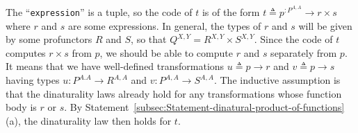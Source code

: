 The \textsf{``}\lstinline!expression!\textsf{''} is a tuple, so the code of $t$
is of the form $t\triangleq p^{:P^{A,A}}\rightarrow r\times s$ where
$r$ and $s$ are some expressions. In general, the types of $r$
and $s$ will be given by some profunctors $R$ and $S$, so that
$Q^{X,Y}=R^{X,Y}\times S^{X,Y}$. Since the code of $t$ computes
$r\times s$ from $p$, we should be able to compute $r$ and $s$
separately from $p$. It means that we have well-defined transformations
$u\triangleq p\rightarrow r$ and $v\triangleq p\rightarrow s$ having
types $u:P^{A.A}\rightarrow R^{A,A}$ and $v:P^{A,A}\rightarrow S^{A,A}$.
The inductive assumption is that the dinaturality laws already hold
for any transformations whose function body is $r$ or $s$. By Statement~\ref{subsec:Statement-dinatural-product-of-functions}(a),
the dinaturality law then holds for $t$.%
\begin{comment}
So, we may assume that the law holds separately for $u$ and $v$:
\[
f^{\downarrow P}\bef u\bef f^{\uparrow R}=f^{\uparrow P}\bef u\bef f^{\downarrow R}\quad,\quad\quad f^{\downarrow P}\bef v\bef f^{\uparrow S}=f^{\uparrow P}\bef v\bef f^{\downarrow S}\quad.
\]
The lifting for $Q$ is expressed through the liftings for $R$ and
$S$ as
\[
f^{\uparrow Q}=f^{\uparrow R}\boxtimes f^{\uparrow S}\quad,\quad\quad f^{\downarrow Q}=f^{\downarrow R}\boxtimes f^{\downarrow S}\quad.
\]
We can now verify the naturality law of $t$ by expressing $t=p\rightarrow u(p)\times v(p)=\Delta\bef(u\boxtimes v)$:
\begin{align*}
{\color{greenunder}\text{expect }f^{\uparrow P}\bef t\bef f^{\downarrow Q}:}\quad & f^{\downarrow P}\bef\gunderline t\bef\gunderline{f^{\uparrow Q}}=\gunderline{f^{\downarrow P}\bef\Delta}\bef(u\boxtimes v)\bef\big(f^{\uparrow R}\boxtimes f^{\uparrow S}\big)\\
{\color{greenunder}\text{naturality of }\Delta:}\quad & =\Delta\bef(f^{\downarrow P}\boxtimes f^{\downarrow P})\bef(u\boxtimes v)\bef\big(f^{\uparrow R}\boxtimes f^{\uparrow S}\big)=\Delta\bef\big(\gunderline{f^{\downarrow P}\bef u\bef f^{\uparrow R}}\big)\boxtimes\big(\gunderline{f^{\downarrow P}\bef v\bef f^{\uparrow S}}\big)\\
{\color{greenunder}\text{inductive assumption}:}\quad & =\Delta\bef\big(f^{\uparrow P}\bef u\bef f^{\downarrow R}\big)\boxtimes\big(f^{\uparrow P}\bef v\bef f^{\downarrow S}\big)=\gunderline{\Delta\bef\big(f^{\uparrow P}\boxtimes f^{\uparrow P}\big)}\bef(u\boxtimes v)\bef\big(\gunderline{f^{\downarrow R}\boxtimes f^{\downarrow S}}\big)\\
{\color{greenunder}\text{naturality of }\Delta:}\quad & =f^{\uparrow P}\bef\gunderline{\Delta\bef(u\boxtimes v)}\bef f^{\downarrow Q}=f^{\uparrow P}\bef t\bef f^{\downarrow Q}\quad.
\end{align*}
\end{comment}


